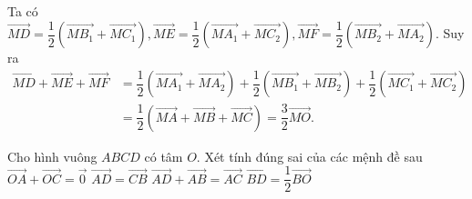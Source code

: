 \begin{ex}
{		Ta có $\overrightarrow{MD}=\dfrac{1}{2}  \left(\overrightarrow{MB_1}+\overrightarrow{MC_1}\right),\overrightarrow{ME}=\dfrac{1}{2} \left(\overrightarrow{MA_1}+\overrightarrow{MC_2}\right),\overrightarrow{MF}=\dfrac{1}{2} \left(\overrightarrow{MB_2}+\overrightarrow{MA_2}\right)$.
		Suy ra 
		$$\begin{aligned}
		\overrightarrow{MD}+\overrightarrow{ME}+\overrightarrow{MF} &=\dfrac{1}{2}  \left(\overrightarrow{MA_1}+\overrightarrow{MA_2}\right)+\dfrac{1}{2} \left(\overrightarrow{MB_1}+\overrightarrow{MB_2}\right)+\dfrac{1}{2} \left(\overrightarrow{MC_1}+\overrightarrow{MC_2}\right)\\
		&=\dfrac{1}{2}  \left(\overrightarrow{MA}+\overrightarrow{MB}+\overrightarrow{MC}\right)=\dfrac{3}{2} \overrightarrow{MO}.
	\end{aligned}$$
 }
\end{ex}



\begin{ex}%
	Cho hình vuông  $ABCD$ có tâm $O$. Xét tính đúng sai của các mệnh đề sau
	\choiceTF 
		{\True $\overrightarrow{OA}+\overrightarrow{OC}=\overrightarrow{0}$} 
		{$\overrightarrow{AD}=\overrightarrow{CB}$} 
		{\True  $\overrightarrow{AD}+\overrightarrow{AB}=\overrightarrow{AC}$}
		 {$\overrightarrow{BD}=\dfrac{1}{2}\overrightarrow{BO}$}
\end{ex}

